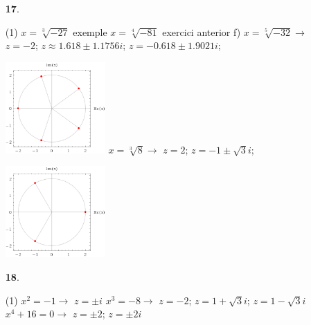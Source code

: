 \documentclass[a4paper, pdf, twoside]{book}
\begin{document}
\begin{multicols}{2}
\begin{enumerate}

 \item[\fontfamily{phv}\selectfont\color{blue}\textbf{17}. ] 
 \begin{tasks}[column-sep=1em, item-indent=1.3333em](1)
	 \task $x=\sqrt [3]{-27}$ exemple
	 \task* $x=\sqrt [4]{-81}$ exercici anterior f)
	 \task* $x=\sqrt [5]{-32}\rightarrow $ $z=-2$; $z\approx 1.618 \pm 1.1756 i$; $z=-0.618 \pm 1.9021 i$; \par \includegraphics [width=0.3\textwidth ]{img-sol/t4-17c}
	 \task* $x=\sqrt [3]{8}\rightarrow $ $z=2$; $z=-1\pm \sqrt {3}i$;\par \includegraphics [width=0.3\textwidth ]{img-sol/t4-17d} 
\end{tasks}
\vspace{0.25cm}



 \item[\fontfamily{phv}\selectfont\color{blue}\textbf{18}. ] 
 \begin{tasks}[column-sep=1em, item-indent=1.3333em](1)
	 \task $x^2=-1\rightarrow $ $z=\pm i$
	 \task* $x^3=-8 \rightarrow $ $z=-2$; $z=1+\sqrt {3}i$; $z=1-\sqrt {3}i$
	 \task* $x^4+16=0 \rightarrow $ $z=\pm 2$; $z=\pm 2i$
\end{tasks}
\vspace{0.25cm}




\end{enumerate}
\end{multicols}
\end{document}
